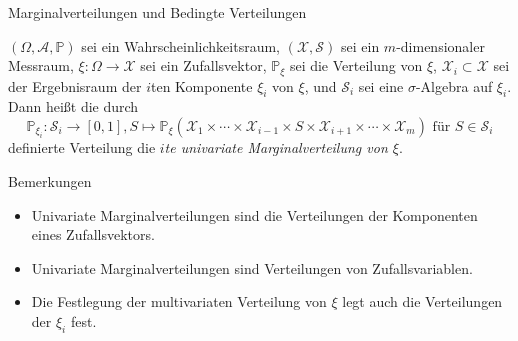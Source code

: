 \documentclass[
  8pt,
  ignorenonframetext,
]{beamer}
\providecommand{\tightlist}{%
  \setlength{\itemsep}{0pt}\setlength{\parskip}{0pt}}
\begin{document}
\begin{frame}{Marginalverteilungen und Bedingte Verteilungen}
\protect\hypertarget{marginalverteilungen-und-bedingte-verteilungen}{}
\small
\begin{definition}
\justifying
$(\Omega, \mathcal{A}, \mathbb{P})$ sei ein Wahrscheinlichkeitsraum,
$(\mathcal{X}, \mathcal{S})$ sei ein $m$-dimensionaler Messraum,
$\xi:\Omega \to \mathcal{X}$ sei ein Zufallsvektor, $\mathbb{P}_\xi$ sei die
Verteilung von $\xi$, $\mathcal{X}_i \subset \mathcal{X}$ sei der Ergebnisraum der
$i$ten Komponente $\xi_i$ von $\xi$, und $\mathcal{S}_i$ sei eine
$\sigma$-Algebra auf $\xi_i$. Dann heißt die durch
\begin{equation}
\mathbb{P}_{\xi_i} : \mathcal{S}_i \to [0,1],
S \mapsto  \mathbb{P}_\xi\left(\mathcal{X}_1
                     \times
                     \cdots
                     \times
                     \mathcal{X}_{i-1}
                     \times S
                     \times \mathcal{X}_{i+1}
                     \times \cdots
                     \times \mathcal{X}_m\right)
\mbox{ für } S \in \mathcal{S}_i
\end{equation}
definierte Verteilung die \textit{$i$te univariate Marginalverteilung von $\xi$}.
\end{definition}

Bemerkungen

\begin{itemize}
\tightlist
\item
  \justifying Univariate Marginalverteilungen sind die Verteilungen der
  Komponenten eines Zufallsvektors.
\item
  Univariate Marginalverteilungen sind Verteilungen von
  Zufallsvariablen.
\item
  Die Festlegung der multivariaten Verteilung von \(\xi\) legt auch die
  Verteilungen der \(\xi_i\) fest.
\end{itemize}
\end{frame}
\end{document}
